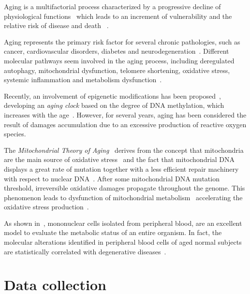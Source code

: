 Aging is a multifactorial process characterized by a progressive decline of physiological functions~\cite{campisi2013aging} which leads to an increment of vulnerability and the relative risk of disease and death ~\cite{bratic2010mitochondrial}.

Aging represents the primary risk factor for several chronic pathologies, such as cancer, cardiovascular disorders, diabetes and neurodegeneration~\cite{lopez2013hallmarks}. Different molecular pathways seem involved in the aging process, including deregulated autophagy, mitochondrial dysfunction, telomere shortening, oxidative stress, systemic inflammation and metabolism dysfunction~\cite{lopez2013hallmarks, riera2016signaling}.

Recently, an involvement of epigenetic modifications has been proposed~\cite{thompson2017epigenetic}, developing an \textit{aging clock} based on the degree of DNA methylation, which increases with the age~\cite{horvath2013dna}. However, for several years, aging has been considered the result of damages accumulation due to an excessive production of reactive oxygen species.

The \textit{Mitochondrial Theory of Aging}~\cite{harman1972biologic, sastre2000mitochondrial} derives from the  concept that mitochondria are the main source of oxidative stress~\cite{cadenas2000mitochondrial, turrens2003mitochondrial, dai2014mitochondrial} and the fact that mitochondrial DNA displays a
great rate of mutation together with a less efficient repair machinery with respect to nuclear DNA~\cite{short2005decline}. After some mitochondrial DNA mutation threshold, irreversible oxidative damages propagate throughout the genome. This phenomenon leads to dysfunction of mitochondrial metabolism~\cite{genova2004mitochondrial} accelerating the oxidative stress production~\cite{wallace2010mitochondrial}.

As shown in~\cite{mckerrell2015leukemia}, mononuclear cells isolated from peripheral blood, are an excellent model to evaluate the metabolic status of an entire organism. In fact, the molecular alterations identified in peripheral blood cells of aged normal subjects are statistically correlated with degenerative diseases~\cite{jaiswal2014age}.


\section{Data collection} \label{sec:frassoni_data_collection}

